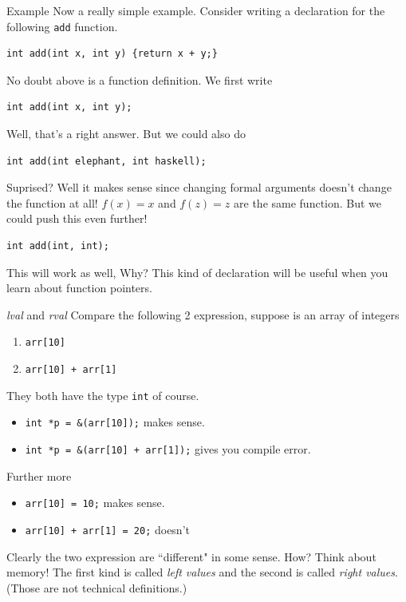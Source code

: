 \begin{frame}[fragile]{Example}
Now a really simple example. Consider writing a declaration for the following \texttt{add} function.
\begin{verbatim}
int add(int x, int y) {return x + y;}
\end{verbatim}
No doubt above is a function definition. We first write
\begin{verbatim}
int add(int x, int y);
\end{verbatim}
Well, that's a right answer. But we could also do
\begin{verbatim}
int add(int elephant, int haskell);
\end{verbatim}
Suprised? Well it makes sense since changing formal arguments doesn't change the function at all! $f(x) = x$ and $f(z) = z$ are the same function. But we could push this even further!
\begin{verbatim}
int add(int, int);
\end{verbatim}
This will work as well, Why? This kind of declaration will be useful when you learn about function pointers.
\end{frame}

\begin{frame}[fragile]{\textit{lval} and \textit{rval}}
Compare the following 2 expression, suppose  is an array of integers
\begin{enumerate}
	\item \texttt{arr[10]}
	\item \texttt{arr[10] + arr[1]}
\end{enumerate}
They both have the type \texttt{int} of course. 
\begin{itemize}
	\item \texttt{int *p = &(arr[10]);} makes sense.
	\item \texttt{int *p = &(arr[10] + arr[1]);} gives you compile error.
\end{itemize}  
Further more
\begin{itemize}
	\item \texttt{arr[10] = 10;} makes sense.
	\item \texttt{arr[10] + arr[1] = 20;} doesn't
\end{itemize} 
Clearly the two expression are ``different" in some sense. How? Think about memory! The first kind is called \textit{left values} and the second is called \textit{right values}. (Those are not technical definitions.)
\end{frame}

